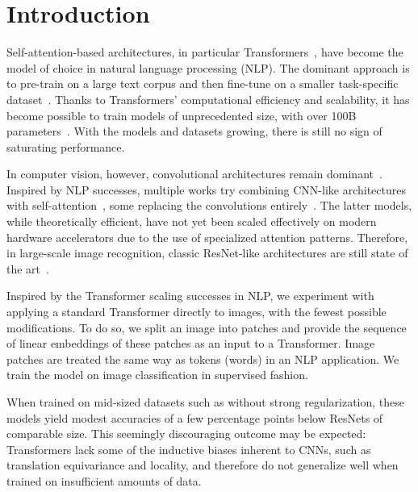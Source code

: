 \section{Introduction}


Self-attention-based architectures, in particular Transformers~\citep{vaswani2017}, have become the model of choice in natural language processing (NLP).
The dominant approach is to pre-train on a large text corpus and then fine-tune on a smaller task-specific dataset~\citep{devlin19-bert}.
Thanks to Transformers' computational efficiency and scalability, it has become possible to train models of unprecedented size, with over 100B parameters~\citep{brown2020-gpt3,lepikhin2020gshard}.
With the models and datasets growing, there is still no sign of saturating performance.


In computer vision, however, convolutional architectures remain dominant~\citep{LeCun1989BackpropagationAT,KrizhevskyNIPS12,he2016deep}.
Inspired by NLP successes, multiple works try combining CNN-like architectures with self-attention~\citep{wang2018-nonlocalnn,carion20-detr}, some replacing the convolutions entirely~\citep{ramachandran19-sasa,wang2020-axialdeeplab}.
The latter models, while theoretically efficient, have not yet been scaled effectively on modern hardware accelerators due to the use of specialized attention patterns.
Therefore, in large-scale image recognition, classic ResNet-like architectures are still state of the art~\citep{mahajan2018,xie2020-noisystudent,kolesnikov2020-bit}.

Inspired by the Transformer scaling successes in NLP, we experiment with applying a standard Transformer directly to images, with the fewest possible modifications.
To do so, we split an image into patches and provide the sequence of linear embeddings of these patches as an input to a Transformer.
Image patches are treated the same way as tokens (words) in an NLP application.
We train the model on image classification in supervised fashion.

When trained on mid-sized datasets such as \imagenet without strong regularization, these models yield modest accuracies of a few percentage points below ResNets of comparable size.
This seemingly discouraging outcome may be expected: Transformers lack some of the inductive biases inherent to CNNs, such as translation equivariance and locality, and therefore do not generalize well when trained on insufficient amounts of data.

